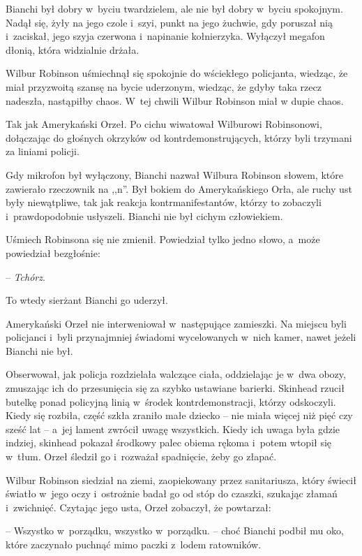 \documentclass[oneside,polish,11pt,sfheadings]{mwbk}
\begin{document}
Bianchi był dobry w~byciu twardzielem, ale nie był dobry w~byciu
spokojnym. Nadął się, żyły na jego czole i~szyi, punkt na jego żuchwie,
gdy poruszał nią i~zaciskał, jego szyja czerwona i~napinanie
kołnierzyka. Wyłączył megafon dłonią, która widzialnie drżała.

Wilbur Robinson uśmiechnął się spokojnie do wściekłego policjanta,
wiedząc, że miał przyzwoitą szansę na bycie uderzonym, wiedząc, że gdyby
taka rzecz nadeszła, nastąpiłby chaos. W~tej chwili Wilbur Robinson miał
w dupie chaos.

Tak jak Amerykański Orzeł. Po cichu wiwatował Wilburowi Robinsonowi,
dołączając do głośnych okrzyków od kontrdemonstrujących, którzy byli
trzymani za liniami policji.

Gdy mikrofon był wyłączony, Bianchi nazwał Wilbura Robinson słowem,
które zawierało rzeczownik na ,,n''. Był bokiem do Amerykańskiego Orła,
ale ruchy ust były niewątpliwe, tak jak reakcja kontrmanifestantów,
którzy to zobaczyli i~prawdopodobnie usłyszeli. Bianchi nie był cichym
człowiekiem.

Uśmiech Robinsona się nie zmienił. Powiedział tylko jedno słowo, a~może
powiedział bezgłośnie: 

-- \textit{Tchórz}.

To wtedy sierżant Bianchi go uderzył.

Amerykański Orzeł nie interweniował w~następujące zamieszki. Na miejscu
byli policjanci i~byli przynajmniej świadomi wycelowanych w~nich kamer,
nawet jeżeli Bianchi nie był.

Obserwował, jak policja rozdzielała walczące ciała, oddzielając je w~dwa
obozy, zmuszając ich do przesunięcia się za szybko ustawiane barierki.
Skinhead rzucił butelkę ponad policyjną linią w~środek
kontrdemonstracji, którzy odskoczyli. Kiedy się rozbiła, część szkła
zraniło małe dziecko -- nie miała więcej niż pięć czy sześć lat -- a~jej
lament zwrócił uwagę wszystkich. Kiedy ich uwaga była gdzie indziej,
skinhead pokazał środkowy palec obiema rękoma i~potem wtopił się w~tłum.
Orzeł śledził go i~rozważał spadnięcie, żeby go złapać.

Wilbur Robinson siedział na ziemi, zaopiekowany przez sanitariusza,
który świecił światło w~jego oczy i~ostrożnie badał go od stóp do
czaszki, szukając złamań i~zwichnięć. Czytając jego usta, Orzeł
zobaczył, że powtarzał: 

-- Wszystko w~porządku, wszystko w~porządku. -- choć Bianchi podbił mu oko, które zaczynało puchnąć mimo paczki z~lodem
ratowników.
\end{document}
